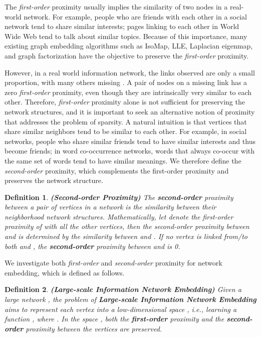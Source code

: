 \documentclass{sig-alternate-2013}
\newtheorem{definition}{Definition}
\begin{document}
The \emph{first-order} proximity usually implies the similarity of two nodes in a real-world network. For example, people who are friends with each other in a social network tend to share similar interests; pages linking to each other in World Wide Web tend to talk about similar topics. Because of this importance, many existing graph embedding algorithms such as IsoMap, LLE,  Laplacian eigenmap, and graph factorization have the objective to preserve the \emph{first-order} proximity.  

However, in a real world information network, the links observed are only a small proportion, with many others missing \cite{liben2007link}. A pair of nodes on a missing link has a zero \emph{first-order} proximity, even though they are intrinsically very similar to each other. Therefore, \emph{first-order} proximity alone is not sufficient for preserving the network structures, and it is important to seek an alternative notion of proximity that addresses the problem of sparsity. A natural intuition is that vertices that share similar neighbors tend to be similar to each other. For example, in social networks, people who share similar friends tend to have similar interests and thus become friends; in word co-occurrence networks, words that always co-occur with the same set of words tend to have similar meanings. We therefore define the \emph{second-order} proximity, which complements the first-order proximity and preserves the network structure.  


\begin{definition}
	\label{def::2nd-proximity}
	\textbf{(Second-order Proximity)} 
	\textsl{The \textbf{second-order} proximity between a pair of vertices  in a network is the similarity between their neighborhood network structures. Mathematically, let  denote the first-order proximity of  with all the other vertices, then the \emph{second-order} proximity between  and  is determined by the similarity between  and . If no vertex is linked from/to both  and , the \textbf{second-order} proximity between  and  is 0.}
\end{definition}	

We investigate both \emph{first-order} and \emph{second-order} proximity for network embedding, which is defined as follows. 

\begin{definition}
	\label{def::LINE}
	\textbf{(Large-scale Information Network Embedding)}
	\textsl{ Given a large network , the problem of \textbf{Large-scale Information Network Embedding} aims to represent each vertex  into a low-dimensional space , i.e., learning a function , where . In the space , both the \textbf{first-order} proximity and the \textbf{second-order} proximity between the vertices are preserved.} 
\end{definition}
\end{document}

